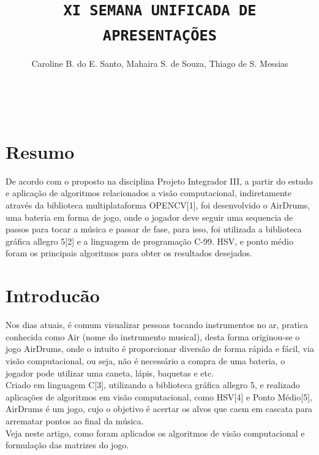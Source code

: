 \documentclass{sciposter}
\title{\Huge \texttt{{\color{NavyBlue}XI SEMANA UNIFICADA DE APRESENTAÇÕES}}}
\author{Caroline B. do E. Santo, Mahaira S. de Souza, Thiago de S. Messias}
\institute{\texttt{{\bf{\color{orange} 8 a 12 de Junho de 2015\\
Bacharelado em Ciência da Computação – Código: BCC\_PI\_III\_N\_G01}}}}
\begin{document}


\maketitle

\bf{\hrulefill}
\\
\begin{multicols}{3}


\section {Resumo}

De acordo com o proposto na disciplina Projeto Integrador III, a partir do estudo e aplicação de algoritmos relacionados a visão computacional, indiretamente através da biblioteca multiplataforma OPENCV[1], foi desenvolvido o AirDrums, uma bateria em forma de jogo, onde o jogador deve seguir uma sequencia de passos para tocar a música e passar de fase, para isso, foi utilizada a biblioteca gráfica allegro 5[2] e a linguagem de programação C-99. HSV, e ponto médio foram os principais algoritmos para obter os resultados desejados.

\section{Introducão}
Nos dias atuais, é comum visualizar pessoas tocando instrumentos no ar, pratica conhecida como Air (nome do instrumento musical), desta forma originou-se o jogo AirDrums, onde o intuito é proporcionar diversão de forma rápida e fácil, via visão computacional, ou seja, não é necessário a compra de uma bateria, o jogador pode utilizar uma caneta, lápis, baquetas e etc. \\
Criado em linguagem C[3], utilizando a biblioteca gráfica allegro 5, e realizado aplicações de algoritmos em visão computacional, como HSV[4] e Ponto Médio[5], AirDrums é um jogo, cujo o objetivo é acertar os alvos que caem em cascata para arrematar pontos ao final da música. \\
Veja neste artigo, como foram aplicados os algoritmos de visão computacional e formulação das matrizes do jogo. 


\end{multicols}
\end{document}
